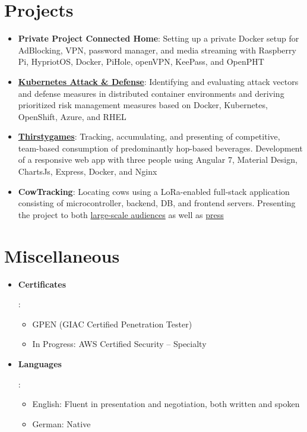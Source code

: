 \documentclass[letterpaper,11pt]{article}
\newcommand{\resumeItemWithoutHeadline}[1]{
	\item\small{
		{#1 \vspace{-2pt}}
	}
}
\newcommand{\resumeSubHeadingListStart}{\begin{itemize}[leftmargin=*]}
\newcommand{\resumeSubHeadingListEnd}{\end{itemize}}
\newcommand{\resumeItemListStart}{\begin{itemize}}
\newcommand{\resumeItemListEnd}{\end{itemize}\vspace{-5pt}}
\begin{document}
\newpage

\section{Projects}
\resumeSubHeadingListStart

\item{
	\textbf{Private Project Connected Home}{: 	\linebreak 
		Setting up a private Docker setup for AdBlocking, VPN, password manager, and media streaming with Raspberry Pi, HypriotOS, Docker, PiHole, openVPN, KeePass, and OpenPHT}
}
\item{
	\textbf{\href{https://github.com/gramsimamsi/bachelorThesis/blob/master/thesis.pdf}{Kubernetes Attack \& Defense}}{: 	\linebreak 
		Identifying and evaluating attack vectors and defense measures in distributed container environments and deriving prioritized risk management measures based on Docker, Kubernetes, OpenShift, Azure, and RHEL}
}
\item{
	\textbf{\href{https://github.com/gramsimamsi/thirstygames}{Thirstygames}}{: 	\linebreak 
		Tracking, accumulating, and presenting of competitive, team-based consumption of predominantly hop-based beverages. Development of a responsive web app with three people using Angular 7, Material Design, ChartsJs, Express, Docker, and Nginx }
}
\item{
	\textbf{CowTracking}{: 	\linebreak 
		Locating cows using a LoRa-enabled full-stack application consisting of microcontroller, backend, DB, and frontend servers. Presenting the project to both \href{https://www.youtube.com/watch?v=JIbElz2qEes}{large-scale audiences} as well as \href{https://www.rfo.de/mediathek/video/digitalisierungsmesse-an-der-hochschule-rosenheim/}{press} }
}
\resumeItemListEnd

\section{Miscellaneous}
\resumeSubHeadingListStart
\item{
	\textbf{Certificates}{: 
		\resumeItemListStart
		\resumeItemWithoutHeadline
		{GPEN (GIAC Certified Penetration Tester)}
		\resumeItemWithoutHeadline
		{In Progress: AWS Certified Security – Specialty}
		\resumeItemListEnd
}}
\item{
	\textbf{Languages}{: 	
		\resumeItemListStart
		\resumeItemWithoutHeadline
		{English: Fluent in presentation and negotiation, both written and spoken}
		\resumeItemWithoutHeadline
		{German: Native}
		\resumeItemListEnd
}}
\resumeSubHeadingListEnd
\end{document}

